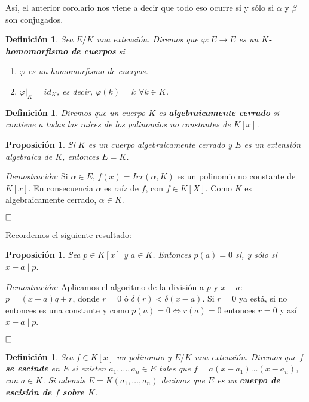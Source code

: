 \documentclass[12pt]{article}
\newtheorem{proposition}[theorem]{Proposición}
\newtheorem{definition}[theorem]{Definición}
\begin{document}
Así, el anterior corolario nos viene a decir que todo eso ocurre si y sólo si $\alpha$ y $\beta$ son conjugados.

\begin{definition} Sea $E/K$ una extensión. Diremos que $\varphi \colon E \longrightarrow E$ es un \textbf{$K$-homomorfismo de cuerpos} si \begin{enumerate}
\item $\varphi$ es un homomorfismo de cuerpos.
\item $ \left.\varphi \right|_K  = id_{K}$, es decir, $\varphi (k) = k$ $\forall k \in K$. 
\end{enumerate}
\end{definition}

\begin{definition} Diremos que un cuerpo $K$ es \textbf{algebraicamente cerrado} si contiene a todas las raíces de los polinomios no constantes de $K[x]$.
\end{definition}

\begin{proposition}Si $K$ es un cuerpo algebraicamente cerrado y $E$ es un extensión algebraica de $K$, entonces $E = K$.
\end{proposition}
\emph{Demostración: } Si $\alpha \in E$, $f(x) = Irr(\alpha, K)$ es un polinomio no constante de $K[x]$. En consecuencia $\alpha$ es raíz de $f$, con $f \in K[X]$. Como $K$ es algebraicamente cerrado, $\alpha \in K$.

$\hfill \square$

Recordemos el siguiente resultado: 

\begin{proposition}\label{eq:ac2} Sea $p \in K[x]$ y $a \in K$. Entonces $p(a) = 0$ si, y sólo si $x-a \mid p$.
\end{proposition}
\emph{Demostración: } Aplicamos el algoritmo de la división a $p$ y $x-a$: $p=(x-a)q + r$, donde $r = 0$ ó $\delta(r) < \delta(x-a)$. Si $r= 0$ ya está, si no entonces es una constante y como $p(a) = 0 \Leftrightarrow r(a)= 0$ entonces $r = 0$ y así $x-a \mid p$.

$\hfill \square$

\begin{definition} Sea $f \in K[x]$ un polinomio y $E/K$ una extensión. Diremos que $f$ \textbf{se escinde} en $E$ si existen $a_{1}, \ldots, a_{n} \in E$ tales que $f = a(x-a_{1}) \ldots (x-a_{n})$, con $a \in K$. Si además $E = K(a_{1}, \ldots, a_{n})$ decimos que $E$ es un \textbf{cuerpo de escisión de $f$ sobre $K$}.
\end{definition}
\end{document}
